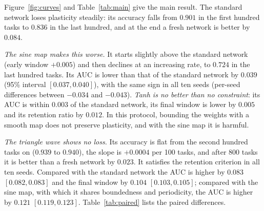 \documentclass[11pt,a4paper]{article}
\begin{document}
Figure~\ref{fig:curves} and Table~\ref{tab:main} give the main result. The standard network loses plasticity
steadily: its accuracy falls from $0.901$ in the first hundred tasks to $0.836$ in the last hundred, and at
the end a fresh network is better by $0.084$.

\emph{The sine map makes this worse.} It starts slightly above the standard network (early window $+0.005$)
and then declines at an increasing rate, to $0.724$ in the last hundred tasks. Its AUC is lower than that of
the standard network by $0.039$ (95\% interval $[0.037,0.040]$), with the same sign in all ten seeds
(per-seed differences between $-0.034$ and $-0.043$). \emph{Tanh is no better than no constraint}: its AUC is
within $0.003$ of the standard network, its final window is lower by $0.005$ and its retention ratio by
$0.012$. In this protocol, bounding the weights with a smooth map does not preserve plasticity, and with the sine map
it is harmful.

\emph{The triangle wave shows no loss.} Its accuracy is flat from the second hundred tasks on ($0.939$ to
$0.940$), the slope is $+0.0004$ per 100 tasks, and after 800 tasks it is better than a fresh network by
$0.023$. It satisfies the retention criterion in all ten seeds. Compared with the standard network the AUC
is higher by $0.083$ $[0.082,0.083]$ and the final window by $0.104$ $[0.103,0.105]$; compared with the sine
map, with which it shares boundedness and periodicity, the AUC is higher by $0.121$ $[0.119,0.123]$.
Table~\ref{tab:paired} lists the paired differences.
\end{document}
